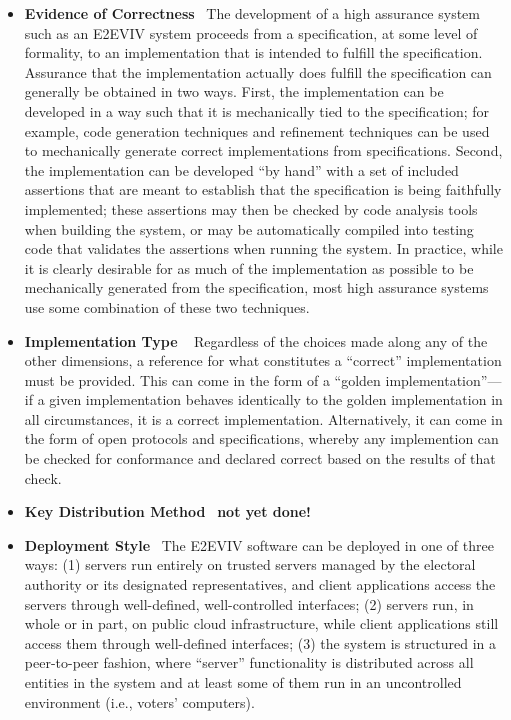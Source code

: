 \begin{itemize}
\item \textbf{Evidence of Correctness} \ The development of a high
  assurance system such as an E2EVIV system proceeds from a
  specification, at some level of formality, to an implementation that
  is intended to fulfill the specification. Assurance that the
  implementation actually does fulfill the specification can generally
  be obtained in two ways. First, the implementation can be developed
  in a way such that it is mechanically tied to the specification; for
  example, code generation techniques and refinement techniques can be
  used to mechanically generate correct implementations from
  specifications. Second, the implementation can be developed ``by
  hand'' with a set of included assertions that are meant to establish
  that the specification is being faithfully implemented; these
  assertions may then be checked by code analysis tools when building
  the system, or may be automatically compiled into testing code that
  validates the assertions when running the system. In practice, while
  it is clearly desirable for as much of the implementation as
  possible to be mechanically generated from the specification, most
  high assurance systems use some combination of these two techniques.

\item \textbf{Implementation Type} \  Regardless of the choices made along any of
  the other dimensions, a reference for what constitutes a ``correct''
  implementation must be provided. This can come in the form of a
  ``golden im\-ple\-men\-ta\-tion''---if a given implementation
  behaves identically to the golden implementation in all
  circumstances, it is a correct implementation. Alternatively, it can
  come in the form of open protocols and specifications, whereby any
  implemention can be checked for conformance and declared correct
  based on the results of that check.

\item \textbf{Key Distribution Method} \ \textbf{not yet done!}

\item \textbf{Deployment Style} \ The E2EVIV software can be deployed
  in one of three ways: (1) servers run entirely on trusted servers
  managed by the electoral authority or its designated
  representatives, and client applications access the servers through
  well-defined, well-controlled interfaces; (2) servers run, in whole
  or in part, on public cloud infrastructure, while client applications
  still access them through well-defined interfaces; (3) the system is
  structured in a peer-to-peer fashion, where ``server'' functionality
  is distributed across all entities in the system and at least some
  of them run in an uncontrolled environment (i.e., voters'
  computers). 


\end{itemize}
